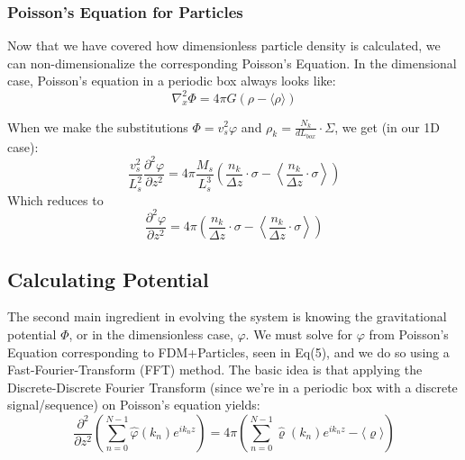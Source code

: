 \documentclass{article}
\newcommand{\pd}{\partial}
\begin{document}
\subsubsection{Poisson's Equation for Particles}\label{Poisson's Equation for Particles}
Now that we have covered how dimensionless particle density is calculated, we can non-dimensionalize the corresponding Poisson's Equation. In the dimensional case, Poisson's equation in a periodic box always looks like:
\begin{equation*}
    \nabla_x^2 \Phi = 4\pi G (\rho - \langle \rho \rangle) 
\end{equation*}

When we make the substitutions $\Phi = v_s^2 \varphi$ and $\rho_k = \frac{N_k}{dL_{box}}\cdot \Sigma$, we get (in our 1D case):
\begin{equation*}
    \frac{v_s^2}{L_s^2}\frac{\pd^2 \varphi}{\pd z^2} = 4\pi \frac{M_s}{L_s^3} \left( \frac{n_k}{\Delta z}\cdot \sigma - \left\langle \frac{n_k}{\Delta z}\cdot \sigma \right\rangle\right)
\end{equation*}
Which reduces to
\begin{equation}
    \frac{\pd^2 \varphi}{\pd z^2} = 4\pi \left( \frac{n_k}{\Delta z}\cdot \sigma - \left\langle \frac{n_k}{\Delta z}\cdot \sigma \right\rangle\right)
\end{equation}

\subsection{Calculating Potential}
The second main ingredient in evolving the system is knowing the gravitational potential $\Phi$, or in the dimensionless case, $\varphi$. We must solve for $\varphi$ from Poisson's Equation corresponding to FDM+Particles, seen in Eq(5), and we do so using a Fast-Fourier-Transform (FFT) method. The basic idea is that applying the Discrete-Discrete Fourier Transform (since we're in a periodic box with a discrete signal/sequence) on Poisson's equation yields:
\begin{equation*}
    \frac{\pd^2}{\pd z^2}\left(\sum_{n=0}^{N-1} \hat{\varphi}(k_n) e^{i k_n z}\right) = 4 \pi \left(\sum_{n=0}^{N-1} \hat{\varrho}(k_n) e^{i k_n z} - \langle\varrho\rangle\right)
\end{equation*}
\end{document}

